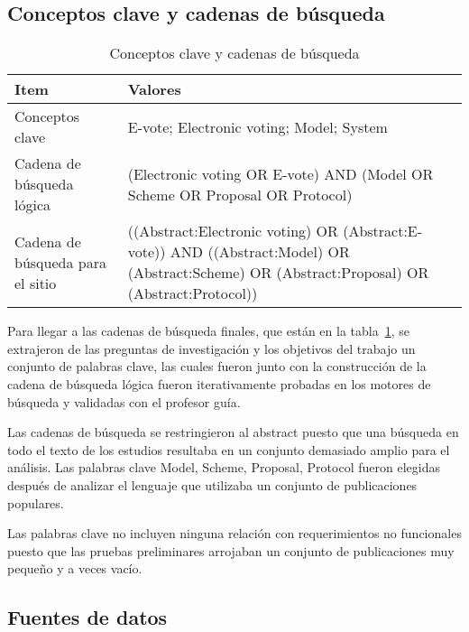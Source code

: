 \subsection{Conceptos clave y cadenas de búsqueda}

\begin{table}
\centering
\caption{Conceptos clave y cadenas de búsqueda}
\label{tab:conceptos-clave}
\begin{tabularx}{\textwidth}{ p{4cm} X } 
\toprule[1.5pt]
\bf 	Item							& 	\bf 	Valores 	\\ \hline
	Conceptos clave     				&	E-vote; Electronic voting; Model; System \\ 
	Cadena de búsqueda lógica		&	(Electronic voting OR E-vote) AND 
									(Model OR Scheme OR Proposal OR Protocol) \\ 
	Cadena de búsqueda para el sitio	&	((Abstract:Electronic voting) OR (Abstract:E-vote)) AND 
									((Abstract:Model) OR (Abstract:Scheme) OR 
									(Abstract:Proposal) OR (Abstract:Protocol)) \\	
					
\bottomrule[1.25pt]
\end{tabularx}
\end{table}
\bigskip


\setlength{\parindent}{1cm}
\setlength{\parskip}{5pt}

Para llegar a las cadenas de búsqueda finales, que están en la 
tabla~\ref{tab:conceptos-clave}, se extrajeron de las preguntas de investigación
y los objetivos del trabajo un conjunto de palabras clave, las cuales fueron
junto con la construcción de la cadena de búsqueda lógica fueron iterativamente 
probadas en los motores de búsqueda y validadas con el profesor guía. 

Las cadenas de búsqueda se restringieron al abstract puesto que una búsqueda
en todo el texto de los estudios resultaba en un conjunto demasiado amplio para el 
análisis. Las palabras clave Model, Scheme, Proposal, Protocol fueron elegidas
después de analizar el lenguaje que utilizaba un conjunto de publicaciones populares.

Las palabras clave no incluyen ninguna relación con requerimientos no funcionales
puesto que las pruebas preliminares arrojaban un conjunto de publicaciones muy pequeño
y a veces vacío.

\subsection{Fuentes de datos}

